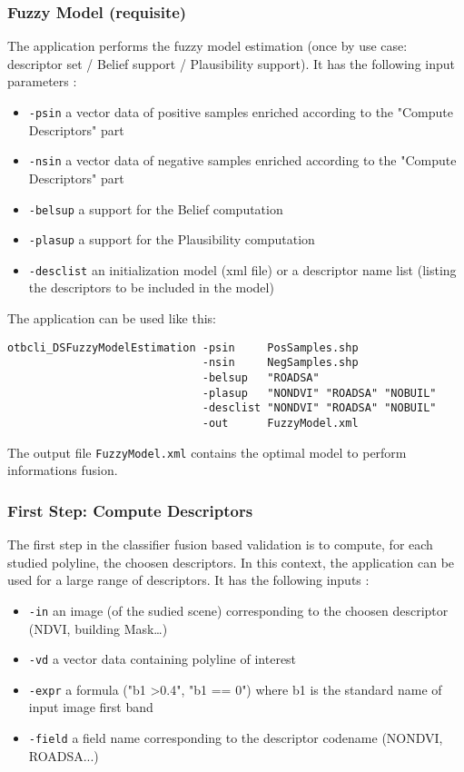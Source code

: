 \subsubsection{Fuzzy Model (requisite)}

The  application performs the fuzzy
model estimation (once by use case: descriptor set / Belief support /
Plausibility support). It has the following input parameters :
\begin{itemize}
\item \verb?-psin? a vector data of positive samples enriched according to the
"Compute Descriptors" part
\item \verb?-nsin? a vector data of negative samples enriched according to the
"Compute Descriptors" part
\item \verb?-belsup? a support for the Belief computation
\item \verb?-plasup? a support for the Plausibility computation
\item \verb?-desclist? an initialization model (xml file) or a descriptor name list
(listing the descriptors to be included in the model)
\end{itemize}

The application can be used like this:
\begin{verbatim}
otbcli_DSFuzzyModelEstimation -psin     PosSamples.shp
                              -nsin     NegSamples.shp
                              -belsup   "ROADSA"
                              -plasup   "NONDVI" "ROADSA" "NOBUIL"
                              -desclist "NONDVI" "ROADSA" "NOBUIL"
                              -out      FuzzyModel.xml
\end{verbatim}

The output file \verb?FuzzyModel.xml? contains the optimal model to perform
informations fusion.

\subsubsection{First Step: Compute Descriptors}

The first step in the classifier fusion based validation is to compute, for
each studied polyline, the choosen descriptors. In this context, the
 application can be used for a
large range of descriptors. It has the following inputs :
\begin{itemize}
\item \verb?-in? an image (of the sudied scene) corresponding to the choosen
descriptor (NDVI, building Mask\dots)
\item \verb?-vd? a vector data containing polyline of interest
\item \verb?-expr? a formula ("b1 \textgreater 0.4", "b1 == 0") where b1 is
the standard name of input image first band
\item \verb?-field? a field name corresponding to the descriptor codename
(NONDVI, ROADSA...)
\end{itemize}

